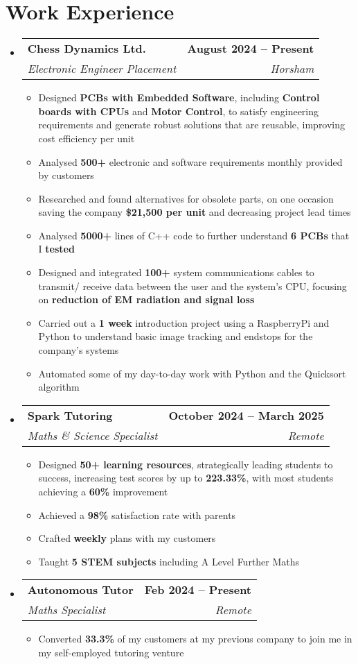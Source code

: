 \documentclass[letterpaper,11pt]{article}
\makeatletter
\newcommand{\resumeItem}[1]{
  \item\small{
    {#1 \vspace{0pt}}
  }
}
\newcommand{\resumeSubheading}[4]{
  \vspace{-2pt}\item
    \begin{tabular*}{1.0\textwidth}[t]{l@{\extracolsep{\fill}}r}
      \textbf{#1} & \textbf{\small #2} \\
      \textit{\small#3} & \textit{\small #4} \\
    \end{tabular*}\vspace{-7pt}
}
\newcommand{\resumeSubHeadingListStart}{\begin{itemize}[leftmargin=0.0in, label={}]}
\newcommand{\resumeSubHeadingListEnd}{\end{itemize}}\vspace{0pt}
\newcommand{\resumeItemListStart}{\begin{itemize}}
\newcommand{\resumeItemListEnd}{\end{itemize}\vspace{-5pt}}
\makeatother
\begin{document}
\section{Work Experience}
    \resumeSubHeadingListStart
                \resumeSubheading{Chess Dynamics Ltd.}{August 2024 -- Present}{Electronic Engineer Placement}{Horsham} 
                \resumeItemListStart
                    \resumeItem{Designed \textbf{PCBs with Embedded Software}, including \textbf{Control boards with CPUs} and \textbf{Motor Control}, to satisfy engineering requirements and generate robust solutions that are reusable, improving cost efficiency per unit}
                    \resumeItem{Analysed \textbf{500+} electronic and software requirements monthly provided by customers}
                    \resumeItem{Researched and found alternatives for obsolete parts, on one occasion saving the company \textbf{\$21,500 per unit} and decreasing project lead times}
                    \resumeItem{Analysed \textbf{5000+} lines of C++ code to further understand \textbf{6 PCBs} that I \textbf{tested}}
                    \resumeItem{Designed and integrated \textbf{100+} system communications cables to transmit/ receive data between the user and the system's CPU, focusing on \textbf{reduction of EM radiation and signal loss}}
                    \resumeItem{Carried out a \textbf{1 week} introduction project using a RaspberryPi and Python to understand basic image tracking and endstops for the company's systems}
                    \resumeItem{Automated some of my day-to-day work with Python and the Quicksort algorithm}
                    \resumeItemListEnd
            \resumeSubheading{Spark Tutoring}{October 2024 -- March 2025}{Maths \& Science Specialist}{Remote} 
                \resumeItemListStart
                    \resumeItem{Designed \textbf{50+ learning resources}, strategically leading students to success, increasing test scores by up to \textbf{223.33\%}, with most students achieving a \textbf{60\%} improvement}
                    \resumeItem{Achieved a \textbf{98\%} satisfaction rate with parents}
                    \resumeItem{Crafted \textbf{weekly} plans with my customers}
                    \resumeItem{Taught \textbf{5 STEM subjects} including A Level Further Maths}
                    \resumeItemListEnd
            \resumeSubheading{Autonomous Tutor}{Feb 2024 -- Present}{Maths Specialist}{Remote}
                \resumeItemListStart
                    \resumeItem{Converted \textbf{33.3\%} of my customers at my previous company to join me in my self-employed tutoring venture}
                    \resumeItemListEnd
    \resumeSubHeadingListEnd
    \vspace{-12pt}
\end{document}
